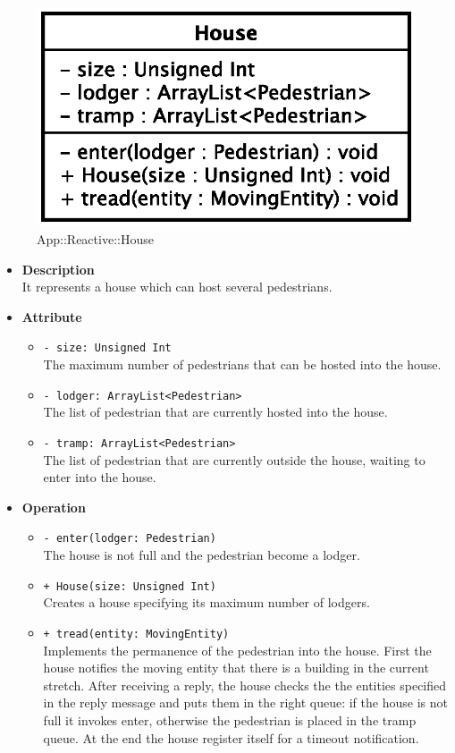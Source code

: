 \begin{figure}[h]
\centering
\includegraphics[scale=0.6,keepaspectratio]{images/solution/house.eps}
\caption{App::Reactive::House}
\label{fig:sd-app-house}
\end{figure}
\FloatBarrier
\begin{itemize}
  \item \textbf{Description} \\
    It represents a house which can host several pedestrians.
  \item \textbf{Attribute}
  \begin{itemize}
    \item \texttt{- size: Unsigned Int} \\
The maximum number of pedestrians that can be hosted into the house.
    \item \texttt{- lodger: ArrayList<Pedestrian>} \\
The list of pedestrian that are currently hosted into the house.
    \item \texttt{- tramp: ArrayList<Pedestrian>} \\
The list of pedestrian that are currently outside the house, waiting to enter into the house.
  \end{itemize}
  \item \textbf{Operation}
  \begin{itemize} 
    \item \texttt{- enter(lodger: Pedestrian)} \\
The house is not full and the pedestrian become a lodger.   
    \item \texttt{+ House(size: Unsigned Int)} \\
Creates a house specifying its maximum number of lodgers.
\item \texttt{+ tread(entity: MovingEntity)} \\
Implements the permanence of the pedestrian into the house. First the house notifies the moving entity that there is a building in the current stretch. After receiving a reply, the house checks the the entities specified in the reply message and puts them in the right queue: if the house is not full it invokes enter, otherwise the pedestrian is placed in the tramp queue. At the end the house register itself for a timeout notification.
  \end{itemize}
\end{itemize}
